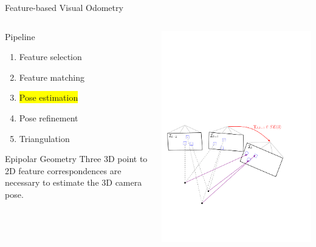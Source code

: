 \documentclass[10pt]{beamer}
\begin{document}
\begin{frame}{Feature-based Visual Odometry}
	\begin{columns}
	  \begin{column}{0.4\textwidth}
	  	\begin{block}{Pipeline}
		  	\begin{enumerate}
				\item Feature selection
				\item Feature matching
				\item \colorbox{yellow}{Pose estimation}
				\item Pose refinement
				\item Triangulation
			\end{enumerate}
		\end{block}
		\begin{block}{Epipolar Geometry}
			Three 3D point to 2D feature correspondences are necessary to estimate the 3D camera pose.
		\end{block}
	  \end{column}
	  \begin{column}{0.6\textwidth}
	    \includegraphics[width=\textwidth]{img/vo_pipeline_5}
	  \end{column}
	\end{columns}
\end{frame}
\end{document}
